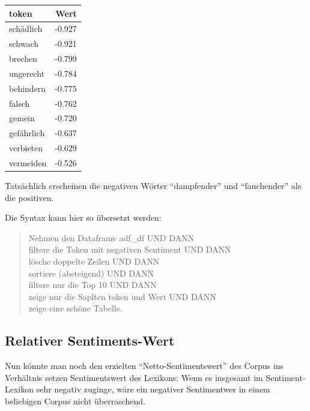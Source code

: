 \documentclass[12pt,]{book}
\makeatletter
\newenvironment{Shaded}{\begin{snugshade}}{\end{snugshade}}
\newcommand{\KeywordTok}[1]{\textcolor[rgb]{0.13,0.29,0.53}{\textbf{{#1}}}}
\newcommand{\DataTypeTok}[1]{\textcolor[rgb]{0.13,0.29,0.53}{{#1}}}
\newcommand{\StringTok}[1]{\textcolor[rgb]{0.31,0.60,0.02}{{#1}}}
\newcommand{\NormalTok}[1]{{#1}}
\newenvironment{kframe}{%
\medskip{}
\setlength{\fboxsep}{.8em}
 \def\at@end@of@kframe{}%
 \ifinner\ifhmode%
  \def\at@end@of@kframe{\end{minipage}}%
  \begin{minipage}{\columnwidth}%
 \fi\fi%
 \def\FrameCommand##1{\hskip\@totalleftmargin \hskip-\fboxsep
 \colorbox{shadecolor}{##1}\hskip-\fboxsep
     \hskip-\linewidth \hskip-\@totalleftmargin \hskip\columnwidth}%
 \MakeFramed {\advance\hsize-\width
   \@totalleftmargin\z@ \linewidth\hsize
   \@setminipage}}%
 {\par\unskip\endMakeFramed%
 \at@end@of@kframe}
\renewenvironment{Shaded}{\begin{kframe}}{\end{kframe}}
\makeatother
\begin{document}
\begin{tabular}{l|r}
\hline
token & Wert\\
\hline
schädlich & -0.927\\
\hline
schwach & -0.921\\
\hline
brechen & -0.799\\
\hline
ungerecht & -0.784\\
\hline
behindern & -0.775\\
\hline
falsch & -0.762\\
\hline
gemein & -0.720\\
\hline
gefährlich & -0.637\\
\hline
verbieten & -0.629\\
\hline
vermeiden & -0.526\\
\hline
\end{tabular}

Tatsächlich erscheinen die negativen Wörter ``dampfender'' und
``fauchender'' als die positiven.

Die Syntax kann hier so übersetzt werden:

\begin{quote}
Nehmen den Dataframe adf\_df UND DANN\\
filtere die Token mit negativen Sentiment UND DANN\\
lösche doppelte Zeilen UND DANN\\
sortiere (absteigend) UND DANN\\
filtere nur die Top 10 UND DANN\\
zeige nur die Saplten token und Wert UND DANN\\
zeige eine schöne Tabelle.
\end{quote}

\subsection{Relativer Sentiments-Wert}\label{relativer-sentiments-wert}

Nun könnte man noch den erzielten ``Netto-Sentimentswert'' des Corpus
ins Verhältnis setzen Sentimentswert des Lexikons: Wenn es insgesamt im
Sentiment-Lexikon sehr negativ zuginge, wäre ein negativer Sentimentwer
in einem beliebigen Corpus nicht überraschend.

\begin{Shaded}
\end{Shaded}
\end{document}
